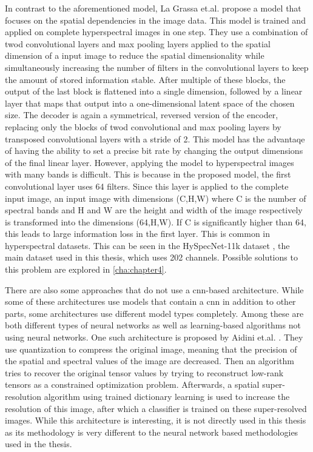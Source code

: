 In contrast to the aforementioned model, La Grassa et.al. \citep{la_grassa_hyperspectral_2022} propose a model that focuses on the spatial dependencies in the image data. This model is trained and applied on complete hyperspectral images in one step. They use a combination of \ac{twod} convolutional layers and max pooling layers applied to the spatial dimension of a input image to reduce the spatial dimensionality while simultaneously increasing the number of filters in the convolutional layers to keep the amount of stored information stable. After multiple of these blocks, the output of the last block is flattened into a single dimension, followed by a linear layer that maps that output into a one-dimensional latent space of the chosen size. The decoder is again a symmetrical, reversed version of the encoder, replacing only the blocks of \ac{twod} convolutional and max pooling layers by transposed convolutional layers with a stride of 2. This model has the advantaqe of having the ability to set a precise bit rate by changing the output dimensions of the final linear layer. However, applying the model to hyperspectral images with many bands is difficult. This is because in the proposed model, the first convolutional layer uses 64 filters. Since this layer is applied to the complete input image, an input image with dimensions (C,H,W) where C is the number of spectral bands and H and W are the height and width of the image respectively is transformed into the dimensions (64,H,W). If C is significantly higher than 64, this leads to large information loss in the first layer. This is common in hyperspectral datasets. This can be seen in the HySpecNet-11k dataset \citep{fuchs_hyspecnet-11k_2023}, the main dataset used in this thesis, which uses 202 channels. Possible solutions to this problem are explored in \autoref{cha:chapter4}.

There are also some approaches that do not use a \ac{cnn}-based architecture. While some of these architectures use models that contain a \ac{cnn} in addition to other parts, some architectures use different model types completely. Among these are both different types of neural networks as well as learning-based algorithms not using neural networks.
One such architecture is proposed by Aidini et.al. \citep{aidini_hyperspectral_2019}. They use quantization to compress the original image, meaning that the precision of the spatial and spectral values of the image are decreased. Then an algorithm tries to recover the original tensor values by trying to reconstruct low-rank tensors as a constrained optimization problem. Afterwards, a spatial super-resolution algorithm using trained dictionary learning is used to increase the resolution of this image, after which a classifier is trained on these super-resolved images. While this architecture is interesting, it is not directly used in this thesis as its methodology is very different to the neural network based methodologies used in the thesis.

